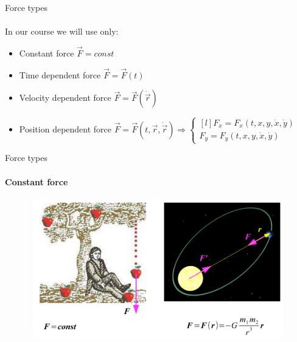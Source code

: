 \documentclass[aspectratio=169]{beamer}
\begin{document}
\begin{frame}[t]{Force types}
    \framesubtitle{}
    In our course we will use only:
    \begin{itemize}
        \item Constant force $\vec{F}=const$
        \item Time dependent force $\vec{F}=\vec{F}(t)$
        \item Velocity dependent force $\vec{F}=\vec{F}(\dot{\vec{r}})$
        \item Position dependent force $\vec{F}=\vec{F}(t,\vec{r},\dot{\vec{r}}) \Rightarrow \left\{\begin{matrix*}[l]
                      F_x = F_x(t,x,y,\dot{x},\dot{y})\\
                      F_y = F_y(t,x,y,\dot{x},\dot{y})
                  \end{matrix*}\right.$
    \end{itemize}
\end{frame}

\begin{frame}[t]{Force types}
    \framesubtitle{Constant force}
    \vspace*{-0.6cm}
    \begin{center}
        \begin{figure}[H]
            \centering\includegraphics[height=6cm,width=1\textwidth,keepaspectratio]{image12.png}
            \label{fig:image12}
        \end{figure}
    \end{center}
\end{frame}
\end{document}
